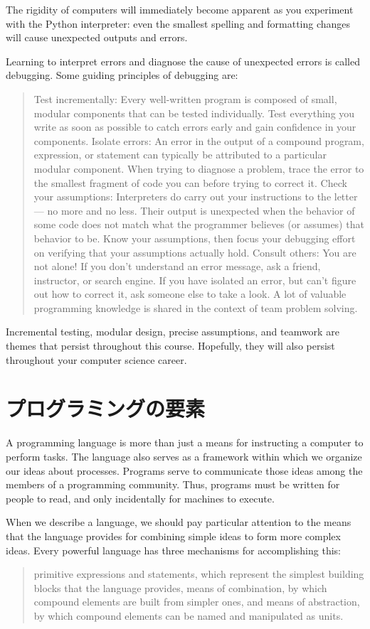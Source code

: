 \documentclass[letterpaper,10pt,dvipdfmx]{sphinxmanual}
\begin{document}
The rigidity of computers will immediately become apparent as you experiment with the Python interpreter: even the smallest spelling and formatting changes will cause unexpected outputs and errors.

Learning to interpret errors and diagnose the cause of unexpected errors is called debugging. Some guiding principles of debugging are:
\begin{quote}

Test incrementally: Every well-written program is composed of small, modular components that can be tested individually. Test everything you write as soon as possible to catch errors early and gain confidence in your components.
Isolate errors: An error in the output of a compound program, expression, or statement can typically be attributed to a particular modular component. When trying to diagnose a problem, trace the error to the smallest fragment of code you can before trying to correct it.
Check your assumptions: Interpreters do carry out your instructions to the letter --- no more and no less. Their output is unexpected when the behavior of some code does not match what the programmer believes (or assumes) that behavior to be. Know your assumptions, then focus your debugging effort on verifying that your assumptions actually hold.
Consult others: You are not alone! If you don't understand an error message, ask a friend, instructor, or search engine. If you have isolated an error, but can't figure out how to correct it, ask someone else to take a look. A lot of valuable programming knowledge is shared in the context of team problem solving.
\end{quote}

Incremental testing, modular design, precise assumptions, and teamwork are themes that persist throughout this course. Hopefully, they will also persist throughout your computer science career.


\section{プログラミングの要素}
\label{functions:id6}
A programming language is more than just a means for instructing a computer to perform tasks. The language also serves as a framework within which we organize our ideas about processes. Programs serve to communicate those ideas among the members of a programming community. Thus, programs must be written for people to read, and only incidentally for machines to execute.

When we describe a language, we should pay particular attention to the means that the language provides for combining simple ideas to form more complex ideas. Every powerful language has three mechanisms for accomplishing this:
\begin{quote}

primitive expressions and statements, which represent the simplest building blocks that the language provides,
means of combination, by which compound elements are built from simpler ones, and
means of abstraction, by which compound elements can be named and manipulated as units.
\end{quote}
\end{document}
